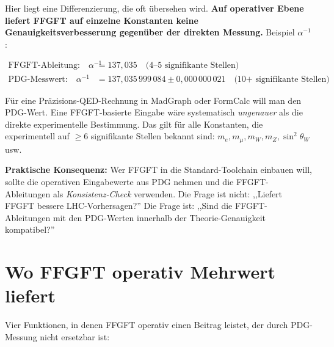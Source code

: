 \documentclass[11pt,a4paper]{article}
\begin{document}
Hier liegt eine Differenzierung, die oft übersehen wird. \textbf{Auf operativer Ebene liefert FFGFT auf einzelne Konstanten keine Genauigkeitsverbesserung gegenüber der direkten Messung.} Beispiel $\alpha^{-1}$:

\begin{align*}
\text{FFGFT-Ableitung:} \quad \alpha^{-1} &= 137{,}035 \quad \text{(4--5 signifikante Stellen)} \\
\text{PDG-Messwert:} \quad \alpha^{-1} &= 137{,}035\,999\,084 \pm 0{,}000\,000\,021 \quad \text{(10+ signifikante Stellen)}
\end{align*}

Für eine Präzisions-QED-Rechnung in MadGraph oder FormCalc will man den PDG-Wert. Eine FFGFT-basierte Eingabe wäre systematisch \emph{ungenauer} als die direkte experimentelle Bestimmung. Das gilt für alle Konstanten, die experimentell auf $\geq 6$ signifikante Stellen bekannt sind: $m_e, m_\mu, m_W, m_Z, \sin^2\theta_W$ usw.

\textbf{Praktische Konsequenz:} Wer FFGFT in die Standard-Toolchain einbauen will, sollte die operativen Eingabewerte aus PDG nehmen und die FFGFT-Ableitungen als \emph{Konsistenz-Check} verwenden. Die Frage ist nicht: ,,Liefert FFGFT bessere LHC-Vorhersagen?'' Die Frage ist: ,,Sind die FFGFT-Ableitungen mit den PDG-Werten innerhalb der Theorie-Genauigkeit kompatibel?''

\section{Wo FFGFT operativ Mehrwert liefert}

Vier Funktionen, in denen FFGFT operativ einen Beitrag leistet, der durch PDG-Messung nicht ersetzbar ist:
\end{document}
